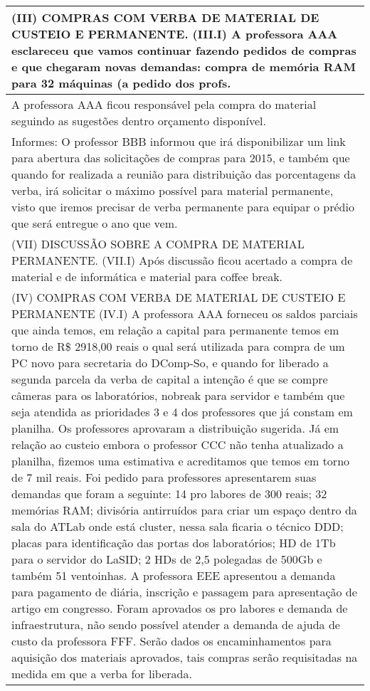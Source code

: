 
\begin{longtable}{|p{17.5cm}|}
\hline 
(III) COMPRAS COM VERBA DE MATERIAL DE CUSTEIO E PERMANENTE. (III.I) A professora AAA esclareceu que vamos continuar fazendo pedidos de compras e que chegaram novas demandas: compra de memória RAM para 32 máquinas (a pedido dos profs.

 \\ \hline 
A professora AAA ficou responsável pela compra do material seguindo as sugestões dentro orçamento disponível.

 \\ \hline 
Informes: O professor BBB informou que irá disponibilizar um link para abertura das solicitações de compras para 2015, e também que quando for realizada a reunião para distribuição das porcentagens da verba, irá solicitar o máximo possível para material permanente, visto que iremos precisar de verba permanente para equipar o prédio que será entregue o ano que vem.

 \\ \hline 
(VII) DISCUSSÃO SOBRE A COMPRA DE MATERIAL PERMANENTE. (VII.I) Após discussão ficou acertado a compra de material e de informática e material para coffee break.

 \\ \hline 
(IV) COMPRAS COM VERBA DE MATERIAL DE CUSTEIO E PERMANENTE (IV.I) A professora AAA forneceu os saldos parciais que ainda temos, em relação a capital para permanente temos em torno de R\$ 2918,00 reais o qual será utilizada para compra de um PC novo para secretaria do DComp-So, e quando for liberado a segunda parcela da verba de capital a intenção é que se compre câmeras para os laboratórios, nobreak para servidor e também que seja atendida as prioridades 3 e 4 dos professores que já constam em planilha. Os professores aprovaram a distribuição sugerida. Já em relação ao custeio embora o professor CCC não tenha atualizado a planilha, fizemos uma estimativa e acreditamos que temos em torno de 7 mil reais. Foi pedido para professores apresentarem suas demandas que foram a seguinte: 14 pro labores de 300 reais; 32 memórias RAM; divisória antirruídos para criar um espaço dentro da sala do ATLab onde está cluster, nessa sala ficaria o técnico DDD; placas para identificação das portas dos laboratórios; HD de 1Tb para o servidor do LaSID; 2 HDs de 2,5 polegadas de 500Gb e também 51 ventoinhas. A professora EEE apresentou a demanda para pagamento de diária, inscrição e passagem para apresentação de artigo em congresso. Foram aprovados os pro labores e demanda de infraestrutura, não sendo possível atender a demanda de ajuda de custo da professora FFF. Serão dados os encaminhamentos para aquisição dos materiais aprovados, tais compras serão requisitadas na medida em que a verba for liberada.

 \\ \hline 

\end{longtable} 



